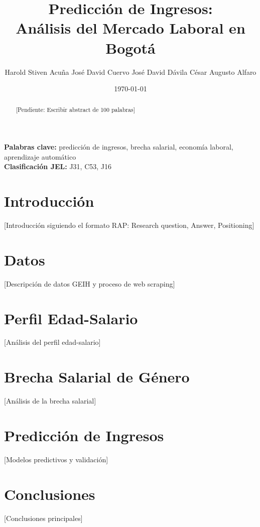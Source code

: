 \documentclass[12pt,a4paper,onecolumn]{article}
\title{Predicción de Ingresos: \\ Análisis del Mercado Laboral en Bogotá}
\author{
    \centering
    Harold Stiven Acuña \newline
    José David Cuervo \newline
    José David Dávila \newline
    César Augusto Alfaro
}
\date{\today}
\begin{document}
\maketitle
\thispagestyle{empty}


\begin{abstract}
[Pendiente: Escribir abstract de 100 palabras]
\end{abstract}

\medskip

\begin{flushleft}
    {\bf Palabras clave:} predicción de ingresos, brecha salarial, economía laboral, aprendizaje automático \\
    {\bf Clasificación JEL:} J31, C53, J16
\end{flushleft}

\pagebreak
\doublespacing


\section{Introducción}
[Introducción siguiendo el formato RAP: Research question, Answer, Positioning]

\section{Datos}
[Descripción de datos GEIH y proceso de web scraping]

\section{Perfil Edad-Salario}
[Análisis del perfil edad-salario]

\section{Brecha Salarial de Género}
[Análisis de la brecha salarial]

\section{Predicción de Ingresos}
[Modelos predictivos y validación]

\section{Conclusiones}
[Conclusiones principales]
\end{document}
